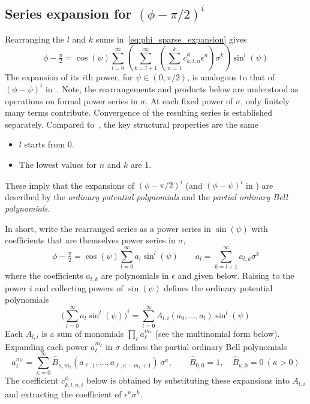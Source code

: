 \documentclass[a4paper]{amsart}
\begin{document}
\subsection{Series expansion for \texorpdfstring{$(\phi-\pi/2)^i$}{(φ - π/2) to the power i}}
Rearranging the $l$ and $k$ sums in~\eqref{eq:phi_sparse_expansion} gives
\begin{equation*}
\phi-\tfrac{\pi}{2} = \cos(\psi)\sum_{l=0}^{\infty}\left(
\sum^\infty_{k=l+1}
\left(\sum_{n=1}^kc^{\phi}_{k,l,n}\epsilon^n\right)\sigma^k\right)\sin^l(\psi)
\end{equation*}
The expansion of its $i$th power, for $\psi\in(0,\pi/2)$, is analogous to that of $(\phi-\psi)^i$ in~\cite{Nilsson2025}.
%
Note, the rearrangements and products below are understood as operations on formal power series in $\sigma$. At each fixed power of $\sigma$, only finitely many terms contribute. Convergence of the resulting series is established separately.
%
Compared to~\cite{Nilsson2025}, the key structural properties are the same
\begin{itemize}
\item $l$ starts from 0.
\item The lowest values for $n$ and $k$ are 1.
\end{itemize}
These imply that the expansions of $(\phi-\pi/2)^i$ (and $(\phi-\psi)^i$ in \cite{Nilsson2025}) are described by the \emph{ordinary potential polynomials} and the \emph{partial ordinary Bell polynomials}.

In short, write the rearranged series as a power series in $\sin(\psi)$ with coefficients that are themselves power series in $\sigma$,
\begin{equation*}
\phi-\tfrac{\pi}{2}=\cos(\psi)\sum_{l=0}^{\infty}a_l\sin^l(\psi)
\qquad
a_l=\sum_{k=l+1}^{\infty}a_{l,k}\sigma^k
\end{equation*}
where the coefficients $a_{l,k}$ are polynomials in $\epsilon$ and given below. Raising to the power $i$ and collecting powers of $\sin(\psi)$ defines the ordinary potential polynomials
\begin{equation*}
\Bigg(\sum_{l=0}^{\infty}a_l\sin^l(\psi)\Bigg)^{i}=\sum_{l=0}^{\infty}A_{l,i}(a_0,\dots,a_l)\sin^l(\psi)
\end{equation*}
Each $A_{l,i}$ is a sum of monomials $\prod_\ell a_\ell^{m_\ell}$ (see the multinomial form below). Expanding each power $a_\ell^{m_\ell}$ in $\sigma$ defines the partial ordinary Bell polynomials
\begin{equation*}
a_\ell^{m_\ell}=\sum_{\kappa=0}^{\infty}\hat{B}_{\kappa,m_\ell}(a_{\ell,1},\dots,a_{\ell,\kappa-m_\ell+1})\,\sigma^\kappa,
\qquad \hat{B}_{0,0}=1,\quad\hat{B}_{\kappa,0}=0\ (\kappa>0)
\end{equation*}
The coefficient $c^{\phi}_{k,l,n,i}$ below is obtained by substituting these expansions into $A_{l,i}$ and extracting the coefficient of $\epsilon^n\sigma^k$.
\end{document}
